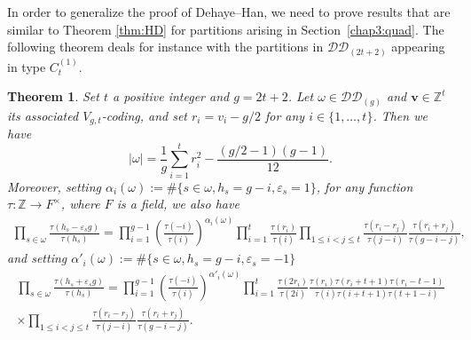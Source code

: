 \documentclass[11pt,letterpaper]{amsart}
\def\bbbz{\mathbb Z}
\def\cch{\mathcal H}
\def\ccdd{\mathcal {DD}}
\newtheorem{df}{Definition}[section]
\newtheorem{thm}[df]{Theorem}
\numberwithin{equation}{section}
\numberwithin{df}{section}
\begin{document}
In order to generalize the proof of Dehaye--Han, we need to prove results that are similar to Theorem \ref{thm:HD} for partitions arising in Section~\ref{chap3:quad}.
The following theorem deals for instance with the partitions in $\ccdd_{(2t+2)}$ appearing in type $C^{(1)}_{t}$.
\begin{thm}\label{thm:DDpair}
Set $t$ a positive integer and $g=2t+2$. Let $\omega\in \ccdd_{(g)}$ and $\mathbf{v}\in\bbbz^{t}$ its associated $V_{g,t}$-coding, and set $r_i=v_i-g/2$ for any $i\in\lbrace1,\dots,t\rbrace$. Then we have
\begin{equation}\label{eq:ddpoids}
\lvert \omega\rvert = \frac{1}{g}\sum_{i=1}^{t} r_i^2-\frac{(g/2-1)(g-1)}{12}.
\end{equation}
Moreover, setting $\alpha_i(\omega):=\#\lbrace s\in\omega, h_s=g-i, \varepsilon_s=1\rbrace$, for any function $\tau:\bbbz\rightarrow F^{\times}$, where $F$ is a field, we also have
\begin{align}\label{eq:thmdd}
\prod_{s\in\omega}\frac{\tau(h_s-\varepsilon_s g)}{\tau(h_s)}=\prod_{i=1}^{g-1}\left(\frac{\tau(-i)}{\tau(i)}\right)^{\alpha_i(\omega)}
\prod_{i=1}^{t}\frac{\tau(r_i)}{\tau(i)}\prod_{1\leq i<j\leq t} \frac{\tau(r_i-r_j)}{\tau(j-i)} \frac{\tau(r_i+r_j)}{\tau(g-i-j)},
\end{align}
and setting $\alpha'_i(\omega):=\#\lbrace s\in\omega, h_s=g-i, \varepsilon_s=-1\rbrace$
\begin{multline}\label{eq:thmddprime}
\prod_{s\in\omega}\frac{\tau(h_s+\varepsilon_s g)}{\tau(h_s)}=\prod_{i=1}^{g-1}\left(\frac{\tau(-i)}{\tau(i)}\right)^{\alpha'_i(\omega)}
\prod_{i=1}^{t}\frac{\tau(2r_i)}{\tau(2i)}\frac{\tau(r_i)\tau(r_i+t+1)\tau(r_i-t-1)}{\tau(i)\tau(i+t+1)\tau(t+1-i)}\\
\times\prod_{1\leq i<j\leq t} \frac{\tau(r_i-r_j)}{\tau(j-i)} \frac{\tau(r_i+r_j)}{\tau(g-i-j)}.
\end{multline}

\end{thm}




\medskip
\end{document}
